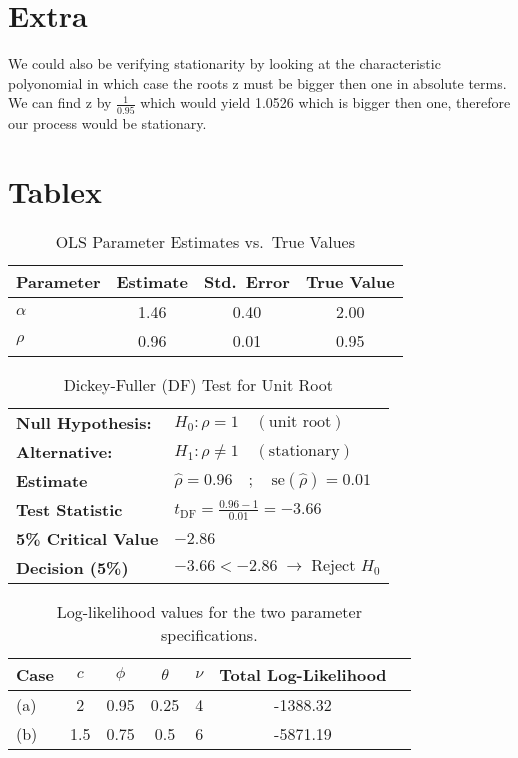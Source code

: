 \documentclass[a4paper,12pt]{article}
\begin{document}
\section{Extra}
We could also be verifying stationarity by looking at the characteristic polyonomial in which case the roots z must be bigger then one in absolute terms. We can find z by $\frac{1}{0.95}$ which would yield 1.0526 which is bigger then one, therefore our process would be stationary.



\section{Tablex}
\begin{table}[ht]
    \centering
    \caption{OLS Parameter Estimates vs.\ True Values}
    \label{tab:ols-results}
    \begin{tabular}{lccc}
        \hline
        \textbf{Parameter} & \textbf{Estimate} & \textbf{Std.\ Error} & \textbf{True Value} \\
        \hline
        $\alpha$ & 1.46 & 0.40 & 2.00 \\
        $\rho$   & 0.96 & 0.01 & 0.95 \\
        \hline
    \end{tabular}
\end{table}

\begin{table}[ht!]
\centering
\caption{Dickey-Fuller (DF) Test for Unit Root}
\label{tab:DF-test}

\begin{tabular}{l l}
\toprule
\textbf{Null Hypothesis:}   & $H_0: \rho = 1 \quad (\text{unit root})$ \\
\textbf{Alternative:}       & $H_1: \rho \neq 1 \quad (\text{stationary})$ \\
\midrule
\textbf{Estimate}           & $\hat{\rho} = 0.96 \quad;\quad \mathrm{se}(\hat{\rho}) = 0.01$ \\
\textbf{Test Statistic}     & $t_{\mathrm{DF}} = \frac{0.96 - 1}{0.01} = -3.66$ \\
\textbf{5\% Critical Value} & $-2.86$ \\
\textbf{Decision (5\%)}     & $-3.66 < -2.86 \;\rightarrow\; \text{Reject } H_0$ \\
\bottomrule
\end{tabular}
\end{table}



\begin{table}[h!]
\centering
\begin{tabular}{@{}lcccccc@{}}
\toprule
Case & $c$ & $\phi$ & $\theta$ & $\nu$ & Total Log-Likelihood \\ \midrule
(a)  & 2   & 0.95   & 0.25     & 4     & -1388.32             \\
(b)  & 1.5 & 0.75   & 0.5      & 6     & -5871.19             \\ \bottomrule
\end{tabular}
\caption{Log-likelihood values for the two parameter specifications.}
\label{tab:results} %
\end{table}
\end{document}
